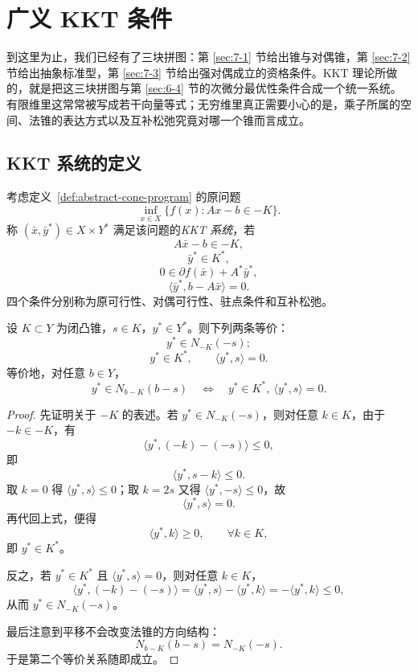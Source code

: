\section{广义 KKT 条件}

\label{sec:7-4}

到这里为止，我们已经有了三块拼图：第 \ref{sec:7-1} 节给出锥与对偶锥，第 \ref{sec:7-2} 节给出抽象标准型，第 \ref{sec:7-3} 节给出强对偶成立的资格条件。KKT 理论所做的，就是把这三块拼图与第 \ref{sec:6-4} 节的次微分最优性条件合成一个统一系统。有限维里这常常被写成若干向量等式；无穷维里真正需要小心的是，乘子所属的空间、法锥的表达方式以及互补松弛究竟对哪一个锥而言成立。

\subsection{KKT 系统的定义}

\begin{definition}\label{def:kkt-cone-system}
考虑定义~\ref{def:abstract-cone-program} 的原问题
\[
\inf_{x\in X}\{f(x):Ax-b\in -K\}.
\]
称 $(\bar x,\bar y^\ast)\in X\times Y^\ast$ 满足该问题的\emph{KKT 系统}，若
\[
A\bar x-b\in -K,
\]
\[
\bar y^\ast\in K^\ast,
\]
\[
0\in \partial f(\bar x)+A^\ast \bar y^\ast,
\]
\[
\langle \bar y^\ast,b-A\bar x\rangle=0.
\]
四个条件分别称为原可行性、对偶可行性、驻点条件和互补松弛。
\end{definition}

\begin{proposition}[锥松弛与对偶锥的互补配对]\label{prop:cone-complementarity-dual-pair}
设 $K\subset Y$ 为闭凸锥，$s\in K$，$y^\ast\in Y^\ast$。则下列两条等价：
\[
y^\ast\in N_{-K}(-s);
\]
\[
y^\ast\in K^\ast,\qquad \langle y^\ast,s\rangle=0.
\]
等价地，对任意 $b\in Y$，
\[
y^\ast\in N_{b-K}(b-s)
\quad \Longleftrightarrow \quad
y^\ast\in K^\ast,\ \langle y^\ast,s\rangle=0.
\]
\end{proposition}

\begin{proof}
先证明关于 $-K$ 的表述。若 $y^\ast\in N_{-K}(-s)$，则对任意 $k\in K$，由于 $-k\in -K$，有
\[
\langle y^\ast,(-k)-(-s)\rangle\le 0,
\]
即
\[
\langle y^\ast,s-k\rangle\le 0.
\]
取 $k=0$ 得 $\langle y^\ast,s\rangle\le 0$；取 $k=2s$ 又得 $\langle y^\ast,-s\rangle\le 0$，故
\[
\langle y^\ast,s\rangle=0.
\]
再代回上式，便得
\[
\langle y^\ast,k\rangle\ge 0,\qquad \forall k\in K,
\]
即 $y^\ast\in K^\ast$。

反之，若 $y^\ast\in K^\ast$ 且 $\langle y^\ast,s\rangle=0$，则对任意 $k\in K$，
\[
\langle y^\ast,(-k)-(-s)\rangle
=
\langle y^\ast,s\rangle-\langle y^\ast,k\rangle
=
-\langle y^\ast,k\rangle\le 0,
\]
从而 $y^\ast\in N_{-K}(-s)$。

最后注意到平移不会改变法锥的方向结构：
\[
N_{b-K}(b-s)=N_{-K}(-s).
\]
于是第二个等价关系随即成立。
\end{proof}

